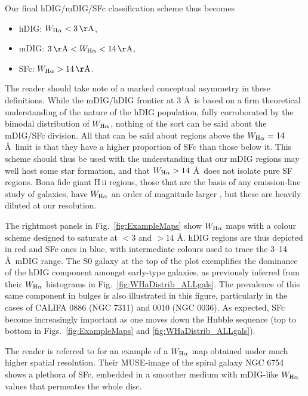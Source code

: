 \documentclass[a4paper, fleqn, usenatbib, useAMS]{mnras}
\newcommand{\Ha}{\ifmmode {\rm H}\alpha \else H$\alpha$\fi\xspace}
\newcommand{\hii}{H\,{\sc ii}\xspace}
\begin{document}
Our final hDIG/mDIG/SFc classification scheme thus becomes

\begin{itemize}
 \item hDIG: $W_{\Ha} < 3 \,\mathrm{\AA}$,
 \item mDIG:  $3 \,\mathrm{\AA}  < W_{\Ha} < 14 \,\mathrm{\AA}$,
 \item SFc: $W_{\Ha} > 14 \,\mathrm{\AA}$.
\end{itemize}

The reader should take note of a marked conceptual asymmetry in these definitions. While the mDIG/hDIG frontier at 3 \AA\ is based on a firm theoretical understanding of the nature of the hDIG population, fully corroborated by the bimodal distribution of $W_{\Ha}$, nothing of the sort can be said about the mDIG/SFc division. All that can be said about regions above the $W_{\Ha} = 14$ \AA\ limit is that they have a higher proportion of SFc than those below it. This scheme should thus be used with the understanding that our mDIG regions may well host some star formation, and that  $W_{\Ha} > 14$ \AA\ does not isolate  pure SF regions. Bona fide giant \hii regions, those that are the basis of any emission-line study of galaxies, have $W_{\Ha}$ an order of magnitude larger \citep{McCall.etal.1985, Garnett.and.Shields.1987, Kennicutt.and.Garnett.1996, Luridiana.and.Peimbert.2001, Bresolin.etal.2004}, but these are heavily diluted at our resolution.

The rightmost panels in Fig.\ \ref{fig:ExampleMaps} show $W_{\Ha}$ maps with a colour scheme designed to saturate at $< 3$ and $> 14$ \AA. hDIG regions are thus depicted in red and SFc ones in blue, with intermediate colours used to trace the 3--14 \AA\  mDIG range. The S0 galaxy at the top of the plot exemplifies the dominance of the hDIG component amongst early-type galaxies, as previously inferred from their $W_{\Ha}$ histograms in Fig.~\ref{fig:WHaDistrib_ALLgals}. The  prevalence of this same component in bulges is also illustrated in this figure, particularly in the cases of CALIFA 0886 (NGC 7311) and 0010 (NGC 0036). As expected, SFc become increasingly important as one moves down the Hubble sequence (top to bottom in  Figs.\ \ref{fig:ExampleMaps} and \ref{fig:WHaDistrib_ALLgals}).

The reader is referred to \citet{Sanchez.etal.2015MUSE} for an example of a $W_{\Ha}$ map obtained under much higher spatial resolution. Their MUSE-image of the spiral galaxy NGC 6754 shows a plethora of SFc, embedded in a smoother medium with mDIG-like $W_{\Ha}$ values that permeates the whole disc.
\end{document}
